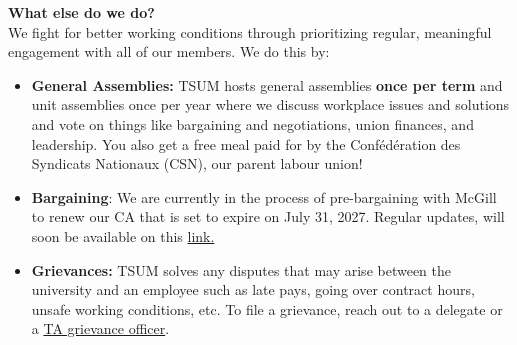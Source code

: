 \noindent \textbf{\sffamily What else do we do?} \\
We fight for better working conditions through prioritizing regular, meaningful engagement with all of our members. We do this by: 
\begin{itemize}
    \item \textbf{General Assemblies:} TSUM hosts general assemblies \textbf{once per term} and unit assemblies once per year where we discuss workplace issues and solutions and vote on things like bargaining and negotiations, union finances, and leadership. You also get a free meal paid for by the Confédération des Syndicats Nationaux (CSN), our parent labour union! \\
    \item \textbf{Bargaining}: We are currently in the process of pre-bargaining with McGill to renew our CA that is set to expire on July 31, 2027. Regular updates, will soon be available on this \href{https://tsum-stsem.ca/news/}{link.}  \\
    \item \textbf{Grievances:} TSUM solves any disputes that may arise between the university and an employee such as late pays, going over contract hours, unsafe working conditions, etc. To file a grievance, reach out to a delegate or a \href{https://tsum-stsem.ca/your-rights/grievance-frequently-asked-questions/}{TA grievance officer}. \\
    
    \end{itemize}

